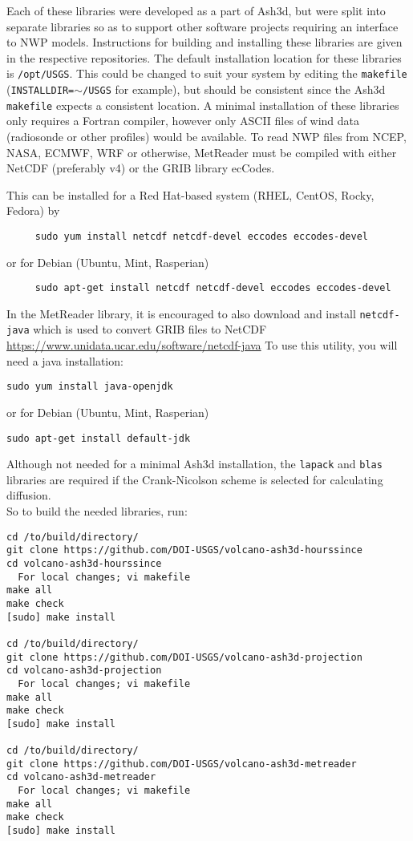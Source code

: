 Each of these libraries were developed as a part of Ash3d, but were split into
separate libraries so as to support other software projects requiring an
interface to NWP models.  Instructions for building and installing these
libraries are given in the respective repositories.  The default installation
location for these libraries is \texttt{/opt/USGS}.  This could be changed to suit
your system by editing the \texttt{makefile}
(\texttt{INSTALLDIR=}$\sim$\texttt{/USGS} for example),
but should be consistent since the Ash3d \texttt{makefile} expects
a consistent location.  A minimal installation of these libraries only requires
a Fortran compiler, however only ASCII files of wind data (radiosonde or other profiles)
would be available.  To read NWP files from NCEP, NASA, ECMWF, WRF or otherwise, 
MetReader must be compiled with either NetCDF (preferably v4) or the GRIB
library ecCodes.

This can be installed for a Red Hat-based system (RHEL, CentOS, Rocky, Fedora) by
\begin{verbatim}
     sudo yum install netcdf netcdf-devel eccodes eccodes-devel
\end{verbatim}
or for Debian (Ubuntu, Mint, Rasperian)
\begin{verbatim}
     sudo apt-get install netcdf netcdf-devel eccodes eccodes-devel
\end{verbatim}

In the MetReader library, it is encouraged to also download and install 
\texttt{netcdf-java} which is used to convert GRIB files to NetCDF
\url{https://www.unidata.ucar.edu/software/netcdf-java}
To use this utility, you will need a java installation:
\begin{verbatim}
sudo yum install java-openjdk
\end{verbatim}
or for Debian (Ubuntu, Mint, Rasperian)
\begin{verbatim}
sudo apt-get install default-jdk
\end{verbatim}

Although not needed for a minimal Ash3d installation, the \texttt{lapack} and \texttt{blas}
libraries are required if the Crank-Nicolson scheme is selected for calculating
diffusion.\\

So to build the needed libraries, run:
\begin{verbatim}
cd /to/build/directory/
git clone https://github.com/DOI-USGS/volcano-ash3d-hourssince
cd volcano-ash3d-hourssince
  For local changes; vi makefile
make all
make check
[sudo] make install

cd /to/build/directory/
git clone https://github.com/DOI-USGS/volcano-ash3d-projection
cd volcano-ash3d-projection
  For local changes; vi makefile
make all
make check
[sudo] make install

cd /to/build/directory/
git clone https://github.com/DOI-USGS/volcano-ash3d-metreader
cd volcano-ash3d-metreader
  For local changes; vi makefile
make all
make check
[sudo] make install
\end{verbatim}

